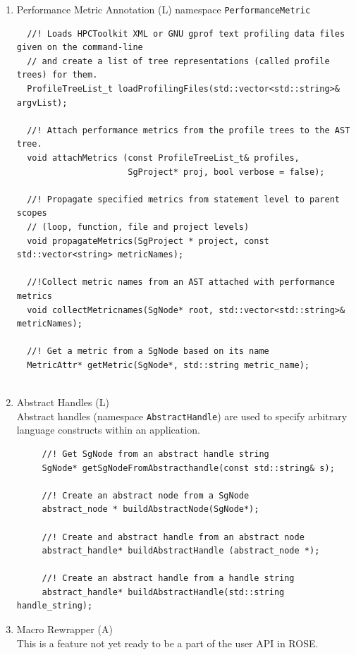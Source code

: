\begin{enumerate}
\begin{lstlisting}
\end{lstlisting}

   \item Performance Metric Annotation (L)
   namespace \lstinline{PerformanceMetric} 
\begin{lstlisting}
  //! Loads HPCToolkit XML or GNU gprof text profiling data files given on the command-line
  // and create a list of tree representations (called profile trees) for them.
  ProfileTreeList_t loadProfilingFiles(std::vector<std::string>& argvList);

  //! Attach performance metrics from the profile trees to the AST tree.
  void attachMetrics (const ProfileTreeList_t& profiles,
                      SgProject* proj, bool verbose = false);

  //! Propagate specified metrics from statement level to parent scopes 
  // (loop, function, file and project levels)
  void propagateMetrics(SgProject * project, const std::vector<string> metricNames);

  //!Collect metric names from an AST attached with performance metrics
  void collectMetricnames(SgNode* root, std::vector<std::string>& metricNames); 

  //! Get a metric from a SgNode based on its name
  MetricAttr* getMetric(SgNode*, std::string metric_name);


\end{lstlisting}

   \item Abstract Handles (L)\\
     Abstract handles (namespace \lstinline{AbstractHandle}) are used to specify arbitrary language constructs within an application.
     \begin{lstlisting}
     //! Get SgNode from an abstract handle string
     SgNode* getSgNodeFromAbstracthandle(const std::string& s);  

     //! Create an abstract node from a SgNode
     abstract_node * buildAbstractNode(SgNode*);

     //! Create and abstract handle from an abstract node
     abstract_handle* buildAbstractHandle (abstract_node *);

     //! Create an abstract handle from a handle string
     abstract_handle* buildAbstractHandle(std::string handle_string);

     \end{lstlisting}

   \item Macro Rewrapper (A) \\
         This is a feature not yet ready to be a part of the user API in ROSE.


\end{enumerate}
